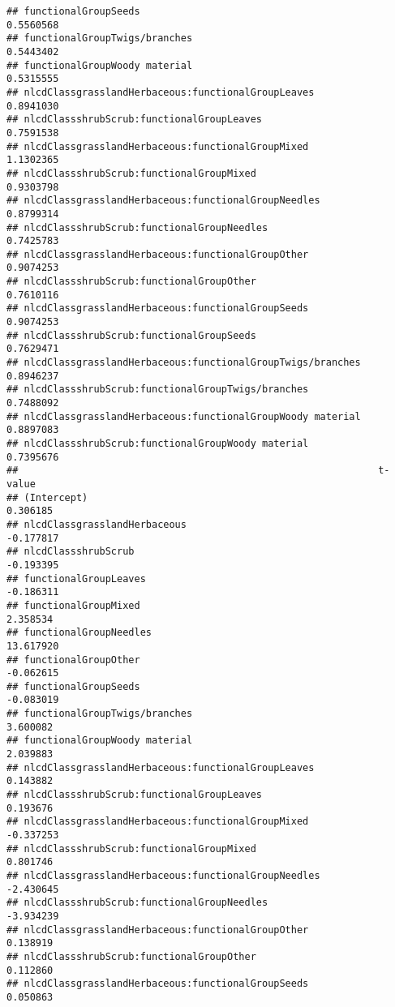 \documentclass[]{article}
\begin{document}
\begin{verbatim}
## functionalGroupSeeds                                       0.5560568
## functionalGroupTwigs/branches                              0.5443402
## functionalGroupWoody material                              0.5315555
## nlcdClassgrasslandHerbaceous:functionalGroupLeaves         0.8941030
## nlcdClassshrubScrub:functionalGroupLeaves                  0.7591538
## nlcdClassgrasslandHerbaceous:functionalGroupMixed          1.1302365
## nlcdClassshrubScrub:functionalGroupMixed                   0.9303798
## nlcdClassgrasslandHerbaceous:functionalGroupNeedles        0.8799314
## nlcdClassshrubScrub:functionalGroupNeedles                 0.7425783
## nlcdClassgrasslandHerbaceous:functionalGroupOther          0.9074253
## nlcdClassshrubScrub:functionalGroupOther                   0.7610116
## nlcdClassgrasslandHerbaceous:functionalGroupSeeds          0.9074253
## nlcdClassshrubScrub:functionalGroupSeeds                   0.7629471
## nlcdClassgrasslandHerbaceous:functionalGroupTwigs/branches 0.8946237
## nlcdClassshrubScrub:functionalGroupTwigs/branches          0.7488092
## nlcdClassgrasslandHerbaceous:functionalGroupWoody material 0.8897083
## nlcdClassshrubScrub:functionalGroupWoody material          0.7395676
##                                                              t-value
## (Intercept)                                                 0.306185
## nlcdClassgrasslandHerbaceous                               -0.177817
## nlcdClassshrubScrub                                        -0.193395
## functionalGroupLeaves                                      -0.186311
## functionalGroupMixed                                        2.358534
## functionalGroupNeedles                                     13.617920
## functionalGroupOther                                       -0.062615
## functionalGroupSeeds                                       -0.083019
## functionalGroupTwigs/branches                               3.600082
## functionalGroupWoody material                               2.039883
## nlcdClassgrasslandHerbaceous:functionalGroupLeaves          0.143882
## nlcdClassshrubScrub:functionalGroupLeaves                   0.193676
## nlcdClassgrasslandHerbaceous:functionalGroupMixed          -0.337253
## nlcdClassshrubScrub:functionalGroupMixed                    0.801746
## nlcdClassgrasslandHerbaceous:functionalGroupNeedles        -2.430645
## nlcdClassshrubScrub:functionalGroupNeedles                 -3.934239
## nlcdClassgrasslandHerbaceous:functionalGroupOther           0.138919
## nlcdClassshrubScrub:functionalGroupOther                    0.112860
## nlcdClassgrasslandHerbaceous:functionalGroupSeeds           0.050863

\end{verbatim}
\end{document}
